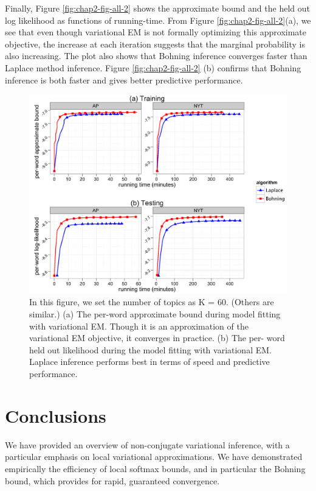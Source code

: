 Finally, Figure \ref{fig:chap2-fig-all-2} shows the approximate bound and the held out log likelihood as functions of running-time. From Figure \ref{fig:chap2-fig-all-2}(a), we see that even though variational EM is not formally optimizing this approximate objective, the increase at each iteration suggests that the marginal probability is also increasing. The plot also shows that Bohning inference converges faster than Laplace method inference. Figure \ref{fig:chap2-fig-all-2}  (b) confirms that Bohning inference is both faster and gives better predictive performance.



\begin{figure}
  \centering
    \hspace*{-1.5cm}\includegraphics[height=0.40\textheight]{../Chap2/plots/figs/fig2-all-2.png}
  \caption{In this figure, we set the number of topics as K = 60. (Others are similar.) (a) The per-word approximate bound during model fitting with variational EM. Though it is an approximation of the variational EM objective, it converges in practice. (b) The per- word held out likelihood during the model fitting with variational EM. Laplace inference performs best in terms of speed and predictive performance.}
  \label{fig:chap3-fig-all-2}
\end{figure}


\section{Conclusions}
We have provided an overview of non-conjugate variational inference, with a particular emphasis on local variational approximations. We have demonstrated empirically the efficiency of local softmax bounds, and in particular the Bohning bound, which provides for rapid, guaranteed convergence.

